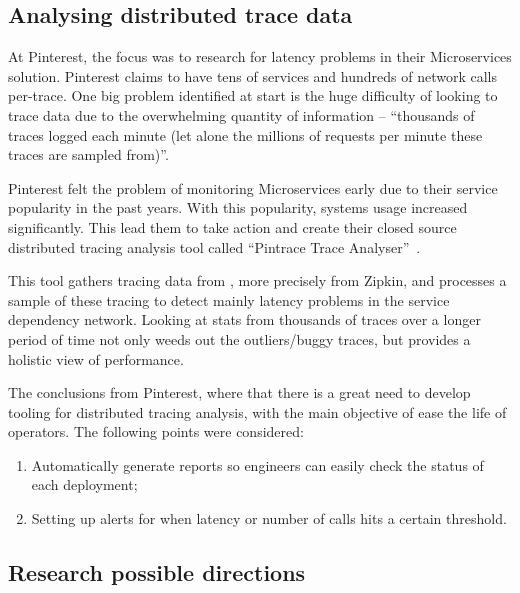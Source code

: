 \subsection{Analysing distributed trace data}
\label{subsec:analysing_distributed_trace_data}

At Pinterest, the focus was to research for latency problems in their Microservices solution. Pinterest claims to have tens of services and hundreds of network calls per-trace. One big problem identified at start is the huge difficulty of looking to trace data due to the overwhelming quantity of information -- ``thousands of traces logged each minute (let alone the millions of requests per minute these traces are sampled from)''.

Pinterest felt the problem of monitoring Microservices early due to their service popularity in the past years. With this popularity, systems usage increased significantly. This lead them to take action and create their closed source distributed tracing analysis tool called ``Pintrace Trace Analyser''~\cite{analysing_distributed_trace_data}.

This tool gathers tracing data from , more precisely from Zipkin, and processes a sample of these tracing to detect mainly latency problems in the service dependency network. Looking at stats from thousands of traces over a longer period of time not only weeds out the outliers/buggy traces, but provides a holistic view of performance.

The conclusions from Pinterest, where that there is a great need to develop tooling for distributed tracing analysis, with the main objective of ease the life of operators. The following points were considered:

\begin{enumerate}
    \item Automatically generate reports so engineers can easily check the status of each deployment;
    \item Setting up alerts for when latency or number of calls hits a certain threshold.
\end{enumerate}

\subsection{Research possible directions}
\label{subsec:research_possible_directions}



